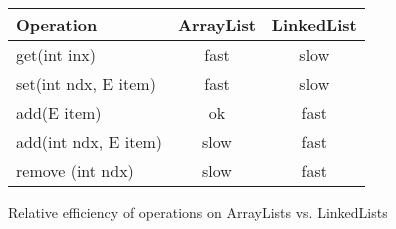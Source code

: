 





\begin {figure}

\begin {tabular} {l | c | c}
Operation      		&  ArrayList    & LinkedList		\\
\hline
get(int inx)		& fast		& slow			\\
set(int ndx, E item)	& fast		& slow			\\
add(E item)		& ok		& fast			\\
add(int ndx, E item)	& slow		& fast			\\
remove (int ndx) 	& slow		& fast
	
\end {tabular}


\caption {Relative efficiency of operations on ArrayLists vs. LinkedLists}
\label {fig:ArrayListVsLinkedList}

\end {figure}


